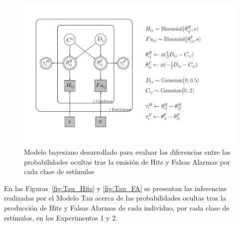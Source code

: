 \begin{figure}[th]
\centering
\includegraphics[width=1.1\textwidth]{Figures/Model_Tau_Diff_Tetas}
\caption[Modelo Tau: Modelo Bayesiano para evaluar las diferencias entre las $\theta$ de Hits y Falsas Alarmas de cada clase de estímulos]{Modelo bayesiano desarrollado para evaluar las diferencias entre las probabilidades ocultas tras la emisión de Hits y Falsas Alarmas por cada clase de estímulos}
\label{fig:Mod_Tau}
\end{figure}

En las Figuras~\ref{fig:Tau_Hits} y \ref{fig:Tau_FA} se presentan las inferencias realizadas por el Modelo Tau acerca de las probabilidades ocultas tras la producción de Hits y Falsas Alarmas de cada individuo, por cada clase de estímulos, en los Experimentos 1 y 2. \\

